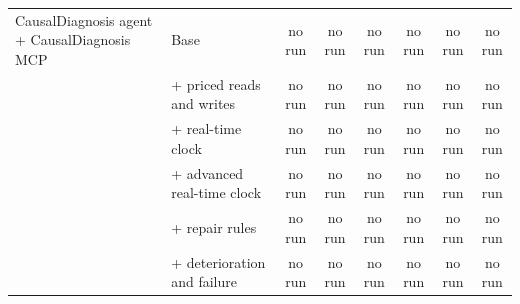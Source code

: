 \documentclass[10pt]{article}
\begin{document}
\begin{table}[H]
\begin{tabular}{llcccccc}
\midrule
CausalDiagnosis agent + CausalDiagnosis MCP & Base & no run & no run & no run & no run & no run & no run \\
 & + priced reads and writes & no run & no run & no run & no run & no run & no run \\
 & + real-time clock & no run & no run & no run & no run & no run & no run \\
 & + advanced real-time clock & no run & no run & no run & no run & no run & no run \\
 & + repair rules & no run & no run & no run & no run & no run & no run \\
 & + deterioration and failure & no run & no run & no run & no run & no run & no run \\
\bottomrule
\end{tabular}
\end{table}
\vspace{-8pt}
\end{document}
